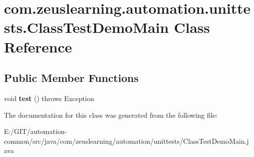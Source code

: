 \hypertarget{classcom_1_1zeuslearning_1_1automation_1_1unittests_1_1ClassTestDemoMain}{}\section{com.\+zeuslearning.\+automation.\+unittests.\+Class\+Test\+Demo\+Main Class Reference}
\label{classcom_1_1zeuslearning_1_1automation_1_1unittests_1_1ClassTestDemoMain}
\subsection*{Public Member Functions}
\begin{DoxyCompactItemize}
\item 
\hypertarget{classcom_1_1zeuslearning_1_1automation_1_1unittests_1_1ClassTestDemoMain_a8d510449509903be17c6c1b1f7fab26a}{}\label{classcom_1_1zeuslearning_1_1automation_1_1unittests_1_1ClassTestDemoMain_a8d510449509903be17c6c1b1f7fab26a} 
void {\bfseries test} ()  throws Exception 
\end{DoxyCompactItemize}


The documentation for this class was generated from the following file\+:\begin{DoxyCompactItemize}
\item 
E\+:/\+G\+I\+T/automation-\/common/src/java/com/zeuslearning/automation/unittests/Class\+Test\+Demo\+Main.\+java\end{DoxyCompactItemize}
